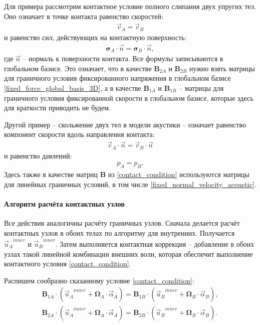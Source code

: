 Для примера рассмотрим контактное условие полного слипания двух упругих тел.
Оно означает в точке контакта равенство скоростей:
\begin{eqnarray}
\vec{v}_A = \vec{v}_B
\end{eqnarray}
и равенство сил, действующих на контактную поверхность:
\begin{eqnarray}
\mathbf{\sigma}_A \cdot \vec{n} = \mathbf{\sigma}_B \cdot \vec{n},
\end{eqnarray}
где $\vec{n}$ -- нормаль к поверхности контакта. 
Все формулы записываются в глобальном базисе. 
Это означает, что в качестве $\mathbf{B}_{2A}$ и $\mathbf{B}_{2B}$ 
нужно взять матрицы для граничного условия фиксированного напряжения в глобальном базисе 
\eqref{fixed_force_global_basis_3D}, а в качестве 
$\mathbf{B}_{1A}$ и $\mathbf{B}_{1B}$ -- матрицы для граничного условия 
фиксированной скорости в глобальном базисе, 
которые здесь для краткости приводить не будем.

Другой пример -- скольжение двух тел в модели акустики -- 
означает равенство компонент скорости вдоль направления контакта:
\begin{eqnarray}
\vec{v}_A \cdot \vec{n} = \vec{v}_B \cdot \vec{n}
\end{eqnarray}
и равенство давлений:
\begin{eqnarray}
p_A = p_B.
\end{eqnarray}
Здесь также в качестве матриц $\mathbf{B}$ из \eqref{contact_condition} 
используются матрицы для линейных граничных условий, в том числе 
\eqref{fixed_normal_velocity_acoustic}.


\paragraph{Алгоритм расчёта контактных узлов}
\label{sec:good-contact-case}
Все действия аналогичны расчёту граничных узлов. 
Сначала делается расчёт контактных узлов в обоих телах по алгоритму для внутренних.
Получается ${\vec{u}_A}^{inner}$ и ${\vec{u}_B}^{inner}$. 
Затем выполняется контактная коррекция -- 
добавление в обоих узлах такой линейной комбинации внешних волн, 
которая обеспечит выполнение контактного условия \eqref{contact_condition}. 

Распишем сообразно сказанному условие \eqref{contact_condition}:
\begin{eqnarray}
	\mathbf{B}_{1A} \cdot ({\vec{u}_A}^{inner} + \mathbf{\Omega}_A \cdot \vec{\alpha}_A) = \mathbf{B}_{1B} \cdot ({\vec{u}_B}^{inner} + \mathbf{\Omega}_B \cdot \vec{\alpha}_B), \\
\label{second_line_in_contact_condition_wide}
	\mathbf{B}_{2A} \cdot ({\vec{u}_A}^{inner} + \mathbf{\Omega}_A \cdot \vec{\alpha}_A) = \mathbf{B}_{2B} \cdot ({\vec{u}_B}^{inner} + \mathbf{\Omega}_B \cdot \vec{\alpha}_B).
\end{eqnarray}

